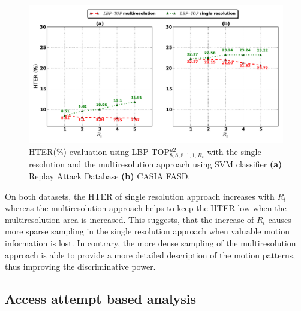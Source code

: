 \begin{figure}[!htb]
\begin{center}
\includegraphics [width=\textwidth] {images/proposed_countermeasure/multiVSsingle.pdf}
\caption[HTER(\%) evaluation using LBP-TOP$_{8,8,8,1,1,R_t}^{u2}$ with the single resolution and the multiresolution approach]{HTER(\%) evaluation using LBP-TOP$_{8,8,8,1,1,R_t}^{u2}$ with the single resolution and the multiresolution approach using SVM classifier \textbf{(a)} Replay Attack Database \textbf{(b)} CASIA FASD.} \label{fig:multiVSsingle}
\end{center}
\end{figure}


On both datasets, the HTER of single resolution approach increases with $R_t$ whereas the multiresolution approach helps to keep the HTER low when the multiresolution area is increased. This suggests, that the increase of $R_t$ causes more sparse sampling in the single resolution approach when valuable motion information is lost. In contrary, the more dense sampling of the multiresolution approach is able to provide a more detailed description of the motion patterns, thus improving the discriminative power.


\subsection{Access attempt based analysis}
\label{sec_attempt}

